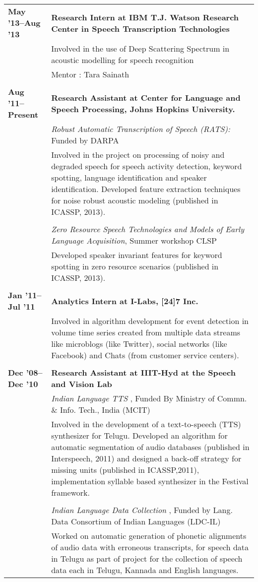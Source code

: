 \documentclass[margin,line,pifont,palatino,courier]{res}
\begin{document}
\begin{resume}
\begin{longtable}{@{}p{1.2in}p{3.8in}}
\textbf{May '13--Aug '13} & \textbf{Research Intern at IBM T.J. Watson Research Center in Speech Transcription Technologies} \\
& Involved in the use of Deep Scattering Spectrum in acoustic modelling for speech recognition\\
& Mentor : Tara Sainath \\
&\\
\textbf{Aug '11--Present} & \textbf{Research Assistant at Center for Language and Speech Processing, Johns Hopkins University.} \\
&\textit{Robust Automatic Transcription of Speech (RATS):} Funded by DARPA \\
&Involved in the project on processing of noisy and degraded speech for speech activity detection, keyword spotting, language identification and speaker identification. Developed feature extraction techniques for noise robust acoustic modeling (published in ICASSP, 2013).\\
&\\
&\textit{Zero Resource Speech Technologies and Models of Early Language Acquisition}, Summer workshop CLSP\\
&Developed speaker invariant features for keyword spotting in zero resource scenarios (published in ICASSP, 2013).\\
&\\
\textbf{Jan '11--Jul '11} & \textbf{Analytics Intern at I-Labs, [24]7 Inc.} \\
&Involved in algorithm development for event detection in volume time series created from multiple data streams like microblogs (like Twitter), social networks (like Facebook) and Chats (from customer service centers).\\
&\\
\textbf{Dec '08--Dec '10 }& \textbf{Research Assistant at IIIT-Hyd at the Speech and Vision Lab} \\

&\textit{Indian Language TTS} ,
Funded By Ministry of Commn. \& Info. Tech., India (MCIT)\\
&Involved in the development of a text-to-speech (TTS) synthesizer for Telugu. Developed an algorithm for automatic segmentation of audio databases (published in Interspeech, 2011) and designed a back-off strategy for missing units (published in ICASSP,2011), implementation syllable based synthesizer in the Festival framework.\\
&\\
&\textit{Indian Language Data Collection} ,
Funded by Lang. Data Consortium of Indian Languages (LDC-IL)\\
&Worked on automatic generation of phonetic alignments of audio data with erroneous transcripts, for speech data in Telugu as part of project for the collection of speech data each in Telugu, Kannada and English languages.\\


\end{longtable}
\end{resume}
\end{document}
